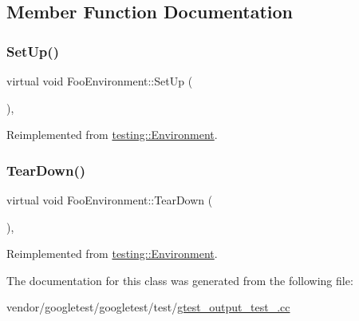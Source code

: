 \subsection{Member Function Documentation}
\mbox{\label{class_foo_environment_a7db8d8b312805aff437ae8534132a56d}} 
\subsubsection{\texorpdfstring{Set\+Up()}{SetUp()}}
{\footnotesize\ttfamily virtual void Foo\+Environment\+::\+Set\+Up (\begin{DoxyParamCaption}{ }\end{DoxyParamCaption})\hspace{0.3cm}{\ttfamily [inline]}, {\ttfamily [virtual]}}



Reimplemented from \hyperlink{classtesting_1_1_environment_a1bf8cafaa9d4eba9feb98655ee434eb3}{testing\+::\+Environment}.

\mbox{\label{class_foo_environment_a99a2c9df52106cce9e7a4bdda53df802}} 
\subsubsection{\texorpdfstring{Tear\+Down()}{TearDown()}}
{\footnotesize\ttfamily virtual void Foo\+Environment\+::\+Tear\+Down (\begin{DoxyParamCaption}{ }\end{DoxyParamCaption})\hspace{0.3cm}{\ttfamily [inline]}, {\ttfamily [virtual]}}



Reimplemented from \hyperlink{classtesting_1_1_environment_a039bdaa705c46b9b88234cf4d3bb6254}{testing\+::\+Environment}.



The documentation for this class was generated from the following file\+:\begin{DoxyCompactItemize}
\item 
vendor/googletest/googletest/test/\hyperlink{gtest__output__test___8cc}{gtest\+\_\+output\+\_\+test\+\_\+.\+cc}\end{DoxyCompactItemize}
